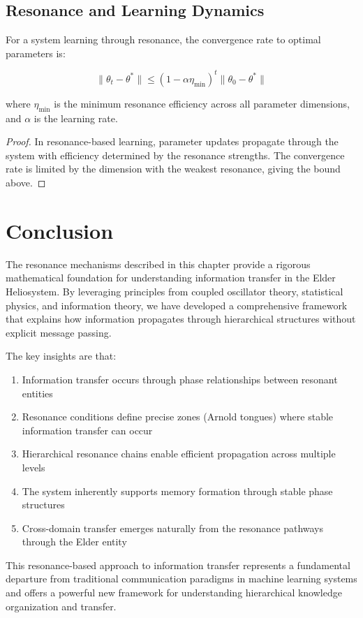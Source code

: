 \subsection{Resonance and Learning Dynamics}

\begin{theorem}
For a system learning through resonance, the convergence rate to optimal parameters is:

\begin{equation}
\|\theta_t - \theta^*\| \leq (1 - \alpha \eta_{\min})^t \|\theta_0 - \theta^*\|
\end{equation}

where $\eta_{\min}$ is the minimum resonance efficiency across all parameter dimensions, and $\alpha$ is the learning rate.
\end{theorem}

\begin{proof}
In resonance-based learning, parameter updates propagate through the system with efficiency determined by the resonance strengths. The convergence rate is limited by the dimension with the weakest resonance, giving the bound above.
\end{proof}

\section{Conclusion}

The resonance mechanisms described in this chapter provide a rigorous mathematical foundation for understanding information transfer in the Elder Heliosystem. By leveraging principles from coupled oscillator theory, statistical physics, and information theory, we have developed a comprehensive framework that explains how information propagates through hierarchical structures without explicit message passing.

The key insights are that:
\begin{enumerate}
    \item Information transfer occurs through phase relationships between resonant entities
    \item Resonance conditions define precise zones (Arnold tongues) where stable information transfer can occur
    \item Hierarchical resonance chains enable efficient propagation across multiple levels
    \item The system inherently supports memory formation through stable phase structures
    \item Cross-domain transfer emerges naturally from the resonance pathways through the Elder entity
\end{enumerate}

This resonance-based approach to information transfer represents a fundamental departure from traditional communication paradigms in machine learning systems and offers a powerful new framework for understanding hierarchical knowledge organization and transfer.